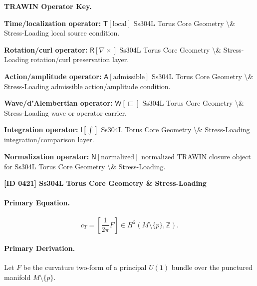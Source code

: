 \par\vspace{0.45\baselineskip}
\noindent\begin{minipage}[t]{\linewidth}
\begingroup
\small
\raggedright
\textbf{TRAWIN Operator Key.}\par
\noindent\textbf{Time/localization operator:} $\mathsf{T}\!\left[\mathrm{local}\right]$ Ss304L Torus Core Geometry \textbackslash{}\& Stress-Loading local source condition.\par
\noindent\textbf{Rotation/curl operator:} $\mathsf{R}\!\left[\nabla\times\right]$ Ss304L Torus Core Geometry \textbackslash{}\& Stress-Loading rotation/curl preservation layer.\par
\noindent\textbf{Action/amplitude operator:} $\mathsf{A}\!\left[\mathrm{admissible}\right]$ Ss304L Torus Core Geometry \textbackslash{}\& Stress-Loading admissible action/amplitude condition.\par
\noindent\textbf{Wave/d'Alembertian operator:} $\mathsf{W}\!\left[\Box\right]$ Ss304L Torus Core Geometry \textbackslash{}\& Stress-Loading wave or operator carrier.\par
\noindent\textbf{Integration operator:} $\mathsf{I}\!\left[\int\right]$ Ss304L Torus Core Geometry \textbackslash{}\& Stress-Loading integration/comparison layer.\par
\noindent\textbf{Normalization operator:} $\mathsf{N}\!\left[\mathrm{normalized}\right]$ normalized TRAWIN closure object for Ss304L Torus Core Geometry \textbackslash{}\& Stress-Loading.\par
\endgroup
\end{minipage}

\clearpage
\noindent\textbf{[ID 0421] Ss304L Torus Core Geometry \& Stress-Loading}\par
\vspace{0.35em}
\paragraph{Primary Equation.}
\begin{equation}
c_T
=
\left[
\frac{1}{2\pi}F
\right]
\in
H^2(M\setminus\{p\},\mathbb{Z}) .
\end{equation}

\paragraph{Primary Derivation.}
Let $F$ be the curvature two-form of a principal $U(1)$ bundle over the punctured manifold $M\setminus\{p\}$.

